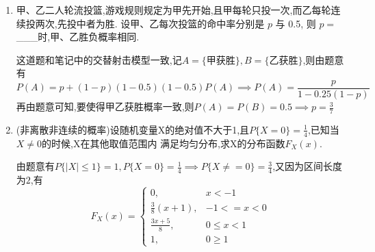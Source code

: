 \documentclass[12pt, a4paper, oneside, UTF8]{ctexbook}
\begin{document}
\begin{enumerate}
\begin{solution}
\begin{align*}
        &\xlongequal{\text{前k-1次不可能产生k件优质品}}\sum_{n=k}^{\infty}P(A_n)P(B_k\mid A_n)\\
        &=\frac{(\lambda p)^k}{k!}e^{-\lambda p}\sum_{n=k}^{\infty}\frac{(\lambda p)^{n-k}}{(n-k)!}e^{-\lambda p} \\
        &\xlongequal{\text{Possion分布}}\frac{(\lambda p)^k}{k!}e^{-\lambda p}
        \end{align*}
        (2)当$m<k$的时候,$P(A_m\mid B_k)=0$,当$m\geq k$,
        \begin{align*}
            P(A_m\mid B_k) &=\frac{P(A_m)P(B_k\mid A_m)}{P(B_k)} \\
            &= \frac{(\lambda q)^{m-k}}{(m-k)!}e^{-\lambda q}, m\in (k,k+1,\ldots)
        \end{align*}
    \end{solution}
    \begin{tcolorbox}[title=总结]
        关于全概率公式与贝叶斯公式的总结 \\
        这种问题的关键在于寻找一个合适的完备事件组,当问题涉及"原因推结果/结果推原因"大概率要用贝叶斯公式(条件概率是贝叶斯的特殊情况)
    \end{tcolorbox}
    \item 甲、乙二人轮流投篮,游戏规则规定为甲先开始,且甲每轮只投一次,而乙每轮连续投两次,先投中者为胜. 设甲、乙每次投篮的命中率分别是 $p$ 与 0.5,
    则 $p =$\_\_\_时,甲、乙胜负概率相同.
    \begin{solution}
        这道题和笔记中的交替射击模型一致,记$A=\{\text{甲获胜}\},B=\{\text{乙获胜}\}$,则由题意有 
        \[
        P(A)=p+(1-p)(1-0.5)(1-0.5)P(A)\implies P(A)=\frac{p}{1-0.25(1-p)}
        \]
        再由题意可知,要使得甲乙获胜概率一致,则$P(A)=P(B)=0.5\implies p = \frac{3}{7}$
    \end{solution}
    \item (非离散非连续的概率)设随机变量X的绝对值不大于1,且$P\{X=0\}=\frac{1}{4}$,已知当$X\neq 0$的时候,X在其他取值范围内
    满足均匀分布,求X的分布函数$F_{X}(x)$.
    \begin{solution}
        由题意有$P\{|X|\leq 1\}=1,P\{X=0\}=\frac{1}{4}\implies P\{X\neq = 0\}=\frac{3}{4}$,又因为区间长度为$2$,有
        \[F_{X}(x) =
        \begin{cases}
            0, & x < -1 \\
            \frac{3}{8}(x+1), & -1 <= x < 0 \\
            \frac{3x+5}{8}, & 0\leq x < 1 \\
            1, & 0 \geq 1
        \end{cases}
\]
\end{solution}
\end{enumerate}
\end{document}
